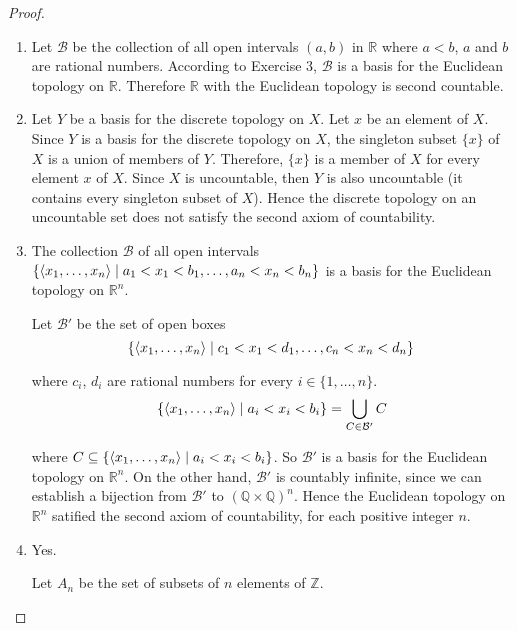 \begin{proof}
    \begin{enumerate}[label={(\roman*)}]
        \item Let $\mathcal{B}$ be the collection of all open intervals $(a, b)$ in $\mathbb{R}$ where $a < b$, $a$ and $b$ are rational numbers. According to Exercise 3, $\mathcal{B}$ is a basis for the Euclidean topology on $\mathbb{R}$. Therefore $\mathbb{R}$ with the Euclidean topology is second countable.
        \item Let $Y$ be a basis for the discrete topology on $X$. Let $x$ be an element of $X$. Since $Y$ is a basis for the discrete topology on $X$, the singleton subset $\{ x \}$ of $X$ is a union of members of $Y$. Therefore, $\{ x \}$ is a member of $X$ for every element $x$ of $X$. Since $X$ is uncountable, then $Y$ is also uncountable (it contains every singleton subset of $X$). Hence the discrete topology on an uncountable set does not satisfy the second axiom of countability.
        \item The collection $\mathcal{B}$ of all open intervals $\{ \left\langle{x_{1}, \ldots, x_{n}}\right\rangle \mid a_{1} < x_{1} < b_{1}, \ldots, a_{n} < x_{n} < b_{n} \}$ is a basis for the Euclidean topology on $\mathbb{R}^{n}$.

              Let $\mathcal{B'}$ be the set of open boxes
              \[
                  \{ \left\langle{x_{1},\ldots, x_{n}}\right\rangle \mid c_{1} < x_{1} < d_{1}, \ldots, c_{n} < x_{n} < d_{n} \}
              \]

              where $c_{i}$, $d_{i}$ are rational numbers for every $i\in \{ 1, \ldots, n \}$.
              \[
                  \{ \left\langle{x_{1},\ldots, x_{n}}\right\rangle \mid a_{i} < x_{i} < b_{i} \} = \bigcup_{C\in\mathcal{B'}} C
              \]

              where $C\subseteq \{ \left\langle{x_{1},\ldots, x_{n}}\right\rangle \mid a_{i} < x_{i} < b_{i} \} $. So $\mathcal{B'}$ is a basis for the Euclidean topology on $\mathbb{R}^{n}$. On the other hand, $\mathcal{B'}$ is countably infinite, since we can establish a bijection from $\mathcal{B'}$ to ${(\mathbb{Q}\times\mathbb{Q})}^{n}$. Hence the Euclidean topology on $\mathbb{R}^{n}$ satified the second axiom of countability, for each positive integer $n$.
        \item Yes.

              Let $A_{n}$ be the set of subsets of $n$ elements of $\mathbb{Z}$.


\end{enumerate}
\end{proof}
